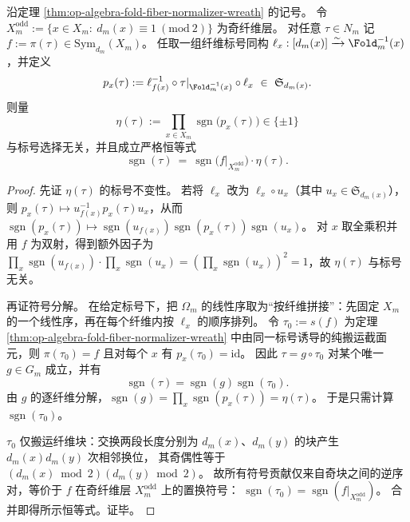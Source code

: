 \begin{proposition}[折叠兼容提升的全局符号分解]\label{prop:op-algebra-fold-lift-global-sign-factorization}
沿定理 \ref{thm:op-algebra-fold-fiber-normalizer-wreath} 的记号。
令 \(X_m^{\mathrm{odd}}:=\{x\in X_m:\ d_m(x)\equiv 1\ (\mathrm{mod}\ 2)\}\) 为奇纤维层。
对任意 \(\tau\in N_m\) 记 \(f:=\pi(\tau)\in \mathrm{Sym}_{d_m}(X_m)\)。
任取一组纤维标号同构 \(\ell_x:[d_m(x)]\xrightarrow{\sim}\Fold_m^{-1}(x)\)，并定义
\[
p_x(\tau):=\ell_{f(x)}^{-1}\circ \tau|_{\Fold_m^{-1}(x)}\circ \ell_x\ \in\ \mathfrak S_{d_m(x)}.
\]
则量
\[
\eta(\tau):=\prod_{x\in X_m}\operatorname{sgn}\bigl(p_x(\tau)\bigr)\in\{\pm1\}
\]
与标号选择无关，并且成立严格恒等式
\[
\boxed{\;
\operatorname{sgn}(\tau)
\ =\
\operatorname{sgn}\bigl(f|_{X_m^{\mathrm{odd}}}\bigr)\cdot \eta(\tau).\;}
\]
\end{proposition}
\begin{proof}
先证 \(\eta(\tau)\) 的标号不变性。
若将 \(\ell_x\) 改为 \(\ell_x\circ u_x\)（其中 \(u_x\in\mathfrak S_{d_m(x)}\)），则
\(
p_x(\tau)\mapsto u_{f(x)}^{-1}p_x(\tau)u_x
\)，从而
\(
\operatorname{sgn}(p_x(\tau))\mapsto \operatorname{sgn}(u_{f(x)})\operatorname{sgn}(p_x(\tau))\operatorname{sgn}(u_x)
\)。
对 \(x\) 取全乘积并用 \(f\) 为双射，得到额外因子为
\(
\prod_x \operatorname{sgn}(u_{f(x)})\cdot \prod_x \operatorname{sgn}(u_x)=(\prod_x \operatorname{sgn}(u_x))^2=1
\)，故 \(\eta(\tau)\) 与标号无关。
\par
再证符号分解。
在给定标号下，把 \(\Omega_m\) 的线性序取为“按纤维拼接”：先固定 \(X_m\) 的一个线性序，再在每个纤维内按 \(\ell_x\) 的顺序排列。
令 \(\tau_0:=s(f)\) 为定理 \ref{thm:op-algebra-fold-fiber-normalizer-wreath} 中由同一标号诱导的纯搬运截面元，则 \(\pi(\tau_0)=f\) 且对每个 \(x\) 有 \(p_x(\tau_0)=\mathrm{id}\)。
因此 \(\tau=g\circ\tau_0\) 对某个唯一 \(g\in G_m\) 成立，并有
\[
\operatorname{sgn}(\tau)=\operatorname{sgn}(g)\operatorname{sgn}(\tau_0).
\]
由 \(g\) 的逐纤维分解，\(\operatorname{sgn}(g)=\prod_x \operatorname{sgn}(p_x(\tau))=\eta(\tau)\)。
于是只需计算 \(\operatorname{sgn}(\tau_0)\)。
\par
\(\tau_0\) 仅搬运纤维块：交换两段长度分别为 \(d_m(x)\)、\(d_m(y)\) 的块产生 \(d_m(x)d_m(y)\) 次相邻换位，
其奇偶性等于 \((d_m(x)\bmod 2)(d_m(y)\bmod 2)\)。
故所有符号贡献仅来自奇块之间的逆序对，等价于 \(f\) 在奇纤维层 \(X_m^{\mathrm{odd}}\) 上的置换符号：
\(
\operatorname{sgn}(\tau_0)=\operatorname{sgn}(f|_{X_m^{\mathrm{odd}}})
\)。
合并即得所示恒等式。证毕。
\end{proof}


